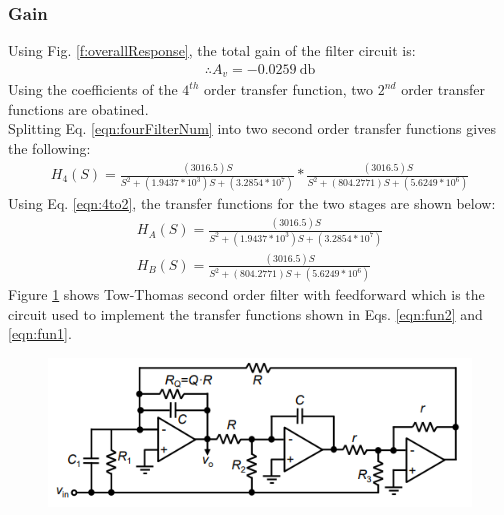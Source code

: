 \documentclass[hidelinks]{article}
\begin{document}
	\subsubsection*{Gain}
	Using Fig. \ref{f:overallResponse}, the total gain of the filter circuit is:
	\begin{align*}
		\therefore A_v = \SI{-0.0259}{\decibel}
	\end{align*}
    Using the coefficients of the $4^{th}$ order transfer function, two $2^{nd}$ order transfer functions are obatined.\\
	Splitting Eq. \ref{eqn:fourFilterNum} into two second order transfer functions gives the following:
	\begin{align}
	\label{eqn:4to2}
		H_4 (S) = \frac{(3016.5) S}{S^{2} + (1.9437 * 10^{3}) S + (3.2854 * 10 ^{7})} * \frac{(3016.5) S}{S^{2} + (804.2771) S + (5.6249 * 10 ^{6})}
	\end{align}
	Using Eq. \ref{eqn:4to2}, the transfer functions for the two stages are shown below:
	\begin{align}
		\label{eqn:fun2}
		H_A (S) = \frac{(3016.5) S}{S^{2} + (1.9437 * 10^{3}) S + (3.2854 * 10 ^{7})}\\
		\label{eqn:fun1}
		H_B (S) = \frac{(3016.5) S}{S^{2} + (804.2771) S + (5.6249 * 10 ^{6})}
	\end{align}
	Figure \ref{f:ttf} shows Tow-Thomas second order filter with feedforward which is the circuit used to implement the transfer functions shown in Eqs. \ref{eqn:fun2} and \ref{eqn:fun1}.
	\begin{figure}[htbp]
		\centering
		\includegraphics[width=0.7\textheight]{ttCircuit.png}
		\label{f:ttf}
	\end{figure}
\end{document}
